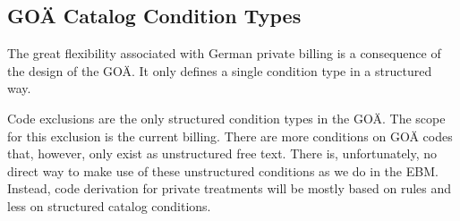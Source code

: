 \subsection{GOÄ Catalog Condition Types}\label{subsec:goa-condition-types}
The great flexibility associated with German private billing is a consequence of the design of the GOÄ.
It only defines a single condition type in a structured way.

Code exclusions are the only structured condition types in the GOÄ.
The scope for this exclusion is the current billing.
There are more conditions on GOÄ codes that, however, only exist as unstructured free text.
There is, unfortunately, no direct way to make use of these unstructured conditions as we do in the EBM.
Instead, code derivation for private treatments will be mostly based on rules and less on structured catalog conditions.
